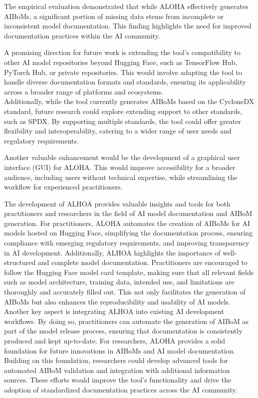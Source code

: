 \documentclass[12pt,a4paper, oneside, openright]{book}
\newcommand{\aibom}{{AIBoM}\xspace}
\newcommand{\aiboms}{{AIBoMs}\xspace}
\begin{document}
The empirical evaluation demonstrated that while ALOHA effectively generates \aiboms, a significant portion of missing data stems from incomplete or inconsistent model documentation. This finding highlights the need for improved documentation practices within the AI community. 

A promising direction for future work is extending the tool’s compatibility to other AI model repositories beyond Hugging Face, such as TensorFlow Hub, PyTorch Hub, or private repositories. This would involve adapting the tool to handle diverse documentation formats and standards, ensuring its applicability across a broader range of platforms and ecosystems.\\
Additionally, while the tool currently generates \aiboms based on the CycloneDX standard, future research could explore extending support to other standards, such as SPDX. 
By supporting multiple standards, the tool could offer greater flexibility and interoperability, catering to a wider range of user needs and regulatory requirements.

Another valuable enhancement would be the development of a graphical user interface (GUI) for ALOHA.  
This would improve accessibility for a broader audience, including users without technical expertise, while streamlining the workflow for experienced practitioners.

The development of ALHOA provides valuable insights and tools for both practitioners and researchers in the field of AI model documentation and \aibom generation. 
For practitioners, ALOHA automates the creation of \aiboms for AI models hosted on Hugging Face, simplifying the documentation process, ensuring compliance with emerging regulatory requirements, and improving transparency in AI development. 
Additionally, ALHOA highlights the importance of well-structured and complete model documentation. Practitioners are encouraged to follow the Hugging Face model card template, making sure that all relevant fields such as model architecture, training data, intended use, and limitations are thoroughly and accurately filled out. This not only facilitates the generation of \aiboms but also enhances the reproducibility and usability of AI models. Another key aspect is integrating ALHOA into existing AI development workflows. By doing so, practitioners can automate the generation of \aibom as part of the model release process, ensuring that documentation is consistently produced and kept up-to-date.
For researchers, ALOHA provides a solid foundation for future innovations in \aiboms and AI model documentation. 
Building on this foundation, researchers could develop advanced tools for automated \aibom validation and integration with additional information sources. 
These efforts would improve the tool’s functionality and drive the adoption of standardized documentation practices across the AI community.
\end{document}
